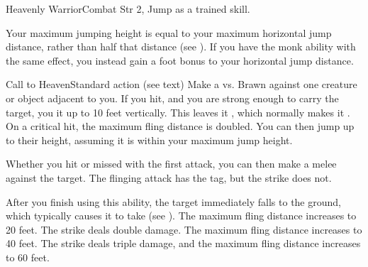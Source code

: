   \begin{feat}{Heavenly Warrior}{Combat}
    \featpre Str 2, Jump as a trained skill.

     Your maximum jumping height is equal to your maximum horizontal jump distance, rather than half that distance (see ).
    If you have the  monk ability with the same effect, you instead gain a  foot bonus to your horizontal jump distance.

    \begin{activeability}{Call to Heaven}{Standard action}
      \abilitytags \atBrawling (see text)
      \rankline
      Make a  vs. Brawn against one creature or object adjacent to you.
      If you hit, and you are strong enough to carry the target, you  it up to 10 feet vertically.
      This leaves it , which normally makes it \unsteady.
      On a critical hit, the maximum fling distance is doubled.
      You can then jump up to their height, assuming it is within your maximum jump height.

      Whether you hit or missed with the first attack, you can then make a melee  against the target.
      The flinging attack has the \atBrawling tag, but the strike does not.

      After you finish using this ability, the target immediately falls to the ground, which typically causes it to take  (see ).
      \rankline
       The maximum fling distance increases to 20 feet.
       The strike deals double damage.
       The maximum fling distance increases to 40 feet.
       The strike deals triple damage, and the maximum fling distance increases to 60 feet.
    \end{activeability}


\end{feat}
